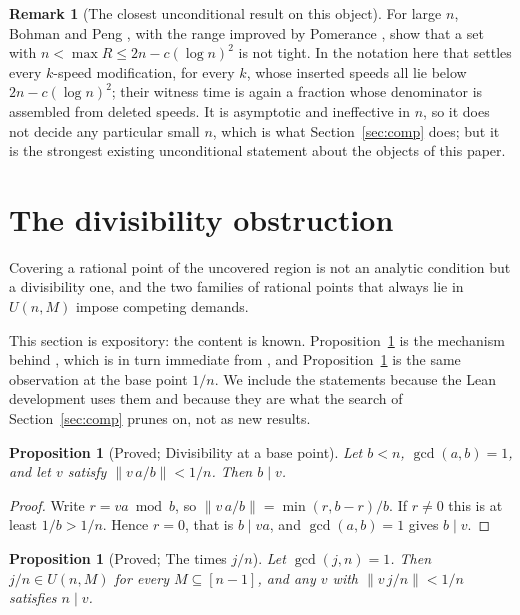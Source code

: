 \documentclass[11pt]{amsart}
\theoremstyle{plain}
\newtheorem{proposition}[theorem]{Proposition}
\theoremstyle{definition}
\newtheorem{remark}[theorem]{Remark}
\newcommand{\nrm}[1]{\left\lVert #1 \right\rVert}
\begin{document}
\begin{remark}[The closest unconditional result on this object]\label{rem:bp}
For large $n$, Bohman and Peng \cite[Thm.~1.3]{bp}, with the range improved by Pomerance
\cite{pomerance}, show that a set with $n<\max R\le 2n-c(\log n)^{2}$ is not tight. In the notation
here that settles every $k$-speed modification, for every $k$, whose inserted speeds all lie below
$2n-c(\log n)^{2}$; their witness time is again a fraction whose denominator is assembled from
deleted speeds. It is asymptotic and ineffective in $n$, so it does not decide any particular small
$n$, which is what Section~\ref{sec:comp} does; but it is the strongest existing unconditional
statement about the objects of this paper.
\end{remark}

\section{The divisibility obstruction}\label{sec:divis}

Covering a rational point of the uncovered region is not an analytic condition but a divisibility
one, and the two families of rational points that always lie in $U(n,M)$ impose competing demands.

This section is expository: the content is known. Proposition~\ref{prop:divbase} is the mechanism
behind \cite[Lemma~2.3]{zhang}, which is in turn immediate from \cite[Lemma~2.2]{gw}, and
Proposition~\ref{prop:divtriv} is the same observation at the base point $1/n$. We include the
statements because the Lean development uses them and because they are what the search of
Section~\ref{sec:comp} prunes on, not as new results.

\begin{proposition}[Proved; Divisibility at a base point]\label{prop:divbase}
Let $b<n$, $\gcd(a,b)=1$, and let $v$ satisfy $\nrm{v\,a/b}<1/n$. Then $b\mid v$.
\end{proposition}

\begin{proof}
Write $r=va\bmod b$, so $\nrm{v\,a/b}=\min(r,b-r)/b$. If $r\ne0$ this is at least $1/b>1/n$. Hence
$r=0$, that is $b\mid va$, and $\gcd(a,b)=1$ gives $b\mid v$.
\end{proof}

\begin{proposition}[Proved; The times $j/n$]\label{prop:divtriv}
Let $\gcd(j,n)=1$. Then $j/n\in U(n,M)$ for \emph{every} $M\subseteq[n-1]$, and any $v$ with
$\nrm{v\,j/n}<1/n$ satisfies $n\mid v$.
\end{proposition}
\end{document}
